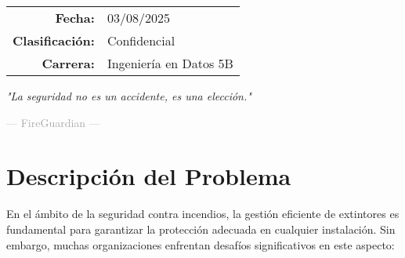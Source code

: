 \documentclass[11pt,a4paper]{article}
\begin{document}
\begin{titlepage}
    \vfill
    
    \begin{flushright}
        \begin{tabular}{r l}
            \textbf{Fecha:} & 03/08/2025 \\
            \textbf{Clasificación:} & Confidencial \\
            \textbf{Carrera:} & Ingeniería en Datos 5B \\
        \end{tabular}
    \end{flushright}
    
    \vspace{1cm}
\end{titlepage}

\thispagestyle{empty}
\begin{center}
    \vspace*{\fill}
    \begin{tcolorbox}[width=0.7\textwidth, colback=white, colframe=white, arc=0mm]
        \begin{center}
            \large\itshape "La seguridad no es un accidente, es una elección."\par
            \vspace{0.5cm}
            \normalsize\textcolor{darkgray}{--- FireGuardian ---}
        \end{center}
    \end{tcolorbox}
    \vspace*{\fill}
\end{center}
\clearpage

\tableofcontents
\newpage

\section{Descripción del Problema}

En el ámbito de la seguridad contra incendios, la gestión eficiente de extintores es fundamental para garantizar la protección adecuada en cualquier instalación. Sin embargo, muchas organizaciones enfrentan desafíos significativos en este aspecto:
\end{document}
